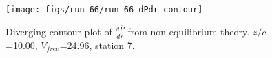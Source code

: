 \begin{figure}[H]
\centering
\texttt{[image: figs/run\_66/run\_66\_dPdr\_contour]}
\caption{Diverging contour plot of $\frac{d\bar{P}}{dr}$ from non-equilibrium theory. $z/c$=10.00, $V_{free}$=24.96, station 7.}
\label{fig:run_66_dPdr_contour}
\end{figure}


